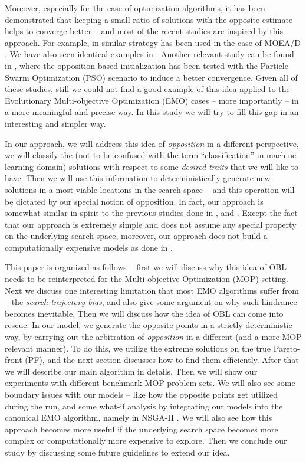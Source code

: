 \documentclass[journal]{IEEEtran}
\begin{document}
Moreover, especially for the case of optimization algorithms, it has been demonstrated that keeping a small ratio of solutions with the opposite estimate helps to converge better \cite{opbil} -- and most of the recent studies are inspired by this approach. For example, in \cite{omoead} similar strategy has been used in the case of MOEA/D \cite{moead-main}. We have also seen identical examples in \cite{omode}. Another relevant study can be found in \cite{opso}, where the opposition based initialization has been tested with the Particle Swarm Optimization (PSO) scenario to induce a better convergence. Given all of these studies, still we could not find a good example of this idea applied to the Evolutionary Multi-objective Optimization (EMO) cases -- more importantly -- in a more meaningful and precise way. In this study we will try to fill this gap in an interesting and simpler way. 

In our approach, we will address this idea of \textit{opposition} in a different perspective, we will classify the (not to be confused with the term ``classification'' in machine learning domain) solutions with respect to some \textit{desired traits} that we will like to have. Then we will use this information to deterministically generate new solutions in a most viable locations in the search space -- and this operation will be dictated by our special notion of opposition. In fact, our approach is somewhat similar in spirit to the previous studies done in \cite{sts-1}, \cite{sts-2} and \cite{directional-mutation}. Except the fact that our approach is extremely simple and does not assume any special property on the underlying search space, moreover, our approach does not build a computationally expensive models as done in \cite{search-history}\cite{segment-search}.

This paper is organized as follows -- first we will discuss why this idea of OBL needs to be reinterpreted for the Multi-objective Optimization (MOP) setting. Next we discuss one interesting limitation that most EMO algorithms suffer from -- the \textit{search trajectory bias}, and also give some argument on why such hindrance becomes inevitable. Then we will discuss how the idea of OBL can come into rescue. In our model, we generate the opposite points in a strictly deterministic way, by carrying out the arbitration of \textit{opposition} in a different (and a more MOP relevant manner). To do this, we utilize the extreme solutions on the true Pareto-front (PF), and the next section discusses how to find them efficiently. After that we will describe our main algorithm in details. Then we will show our experiments with different benchmark MOP problem sets. We will also see some boundary issues with our models -- like how the opposite points get utilized during the run, and some what-if analysis by integrating our models into the canonical EMO algorithm, namely in NSGA-II \cite{nsga2-main}. We will also see how this approach becomes more useful if the underlying search space becomes more complex or computationally more expensive to explore. Then we conclude our study by discussing some future guidelines to extend our idea.
\end{document}
